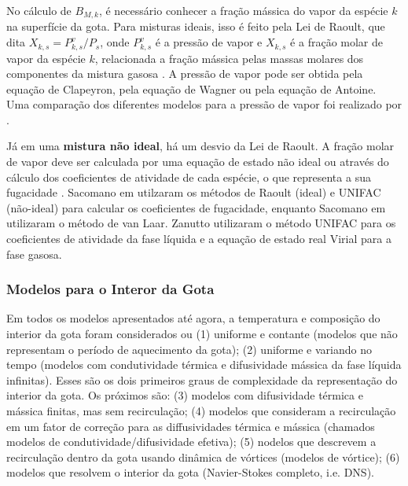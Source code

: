 No cálculo de $B_{M,k}$, é necessário conhecer a fração mássica do vapor da espécie $k$ na superfície da gota.
Para misturas ideais, isso é feito pela Lei de Raoult, que dita $X_{k,s}=P^v_{k,s}/P_s$, onde $P^v_{k,s}$ é a pressão de vapor e $X_{k,s}$ é a fração molar de vapor da espécie $k$, relacionada a fração mássica pelas massas molares dos componentes da mistura gasosa \cite{Peters2010}.
A pressão de vapor pode ser obtida pela equação de Clapeyron, pela equação de Wagner ou pela equação de Antoine.
Uma comparação dos diferentes modelos para a pressão de vapor foi realizado por \cite{SacomanoF2019IJHMT}.

Já em uma \textbf{mistura não ideal}, há um desvio da Lei de Raoult. 
A fração molar de vapor deve ser calculada por uma equação de estado não ideal ou através do cálculo dos coeficientes de atividade de cada espécie, o que representa a sua fugacidade \cite{Bird2002}.
Sacomano\etal{} em \cite{SacomanoF2022IJHMT} utilzaram os métodos de  Raoult (ideal) e UNIFAC (não-ideal) para calcular os coeficientes de fugacidade, enquanto Sacomano\etal{} em \cite{SacomanoF2025CF} utilizaram o método de van Laar.
Zanutto\etal{} \cite{ZanuttoC2019} utilizaram o método UNIFAC para os coeficientes de atividade da fase líquida e a equação de estado real Virial para a fase gasosa.


\subsubsection{Modelos para o Interor da Gota} \label{sec:int}

Em todos os modelos apresentados até agora, a temperatura e composição do interior da gota foram considerados ou (1) uniforme e contante (modelos que não representam o período de aquecimento da gota); (2) uniforme e variando no tempo (modelos com condutividade térmica e difusividade mássica da fase líquida infinitas).
Esses são os dois primeiros graus de complexidade da representação do interior da gota.
Os próximos são: (3) modelos com difusividade térmica e mássica finitas, mas sem recirculação; (4) modelos que consideram a recirculação em um fator de correção para as diffusividades térmica e mássica (chamados modelos de condutividade/difusividade efetiva); (5) nodelos que descrevem a recirculação dentro da gota usando dinâmica de vórtices (modelos de vórtice); (6) modelos que resolvem o interior da gota (Navier-Stokes completo, i.e. DNS). \cite{Sazhin2006}

